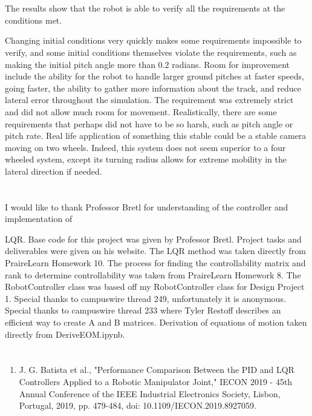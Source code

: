 \documentclass[10pt, letterbox]{article}
\begin{document}
\section{}
\begin{addmargin}[5em]{0em}
The results show that the robot is able to verify all the requirements at the conditions met. \end{addmargin}Changing initial conditions very quickly makes some requirements impossible to verify, and some initial conditions themselves violate the requirements, such as making the initial pitch angle more than 0.2 radians. Room for improvement include the ability for the robot to handle larger ground pitches at faster speeds, going faster, the ability to gather more information about the track, and reduce lateral error throughout the simulation. The requirement was extremely strict and did not allow much room for movement. Realistically, there are some requirements that perhaps did not have to be so harsh, such as pitch angle or pitch rate. Real life application of something this stable could be a stable camera moving on two wheels. Indeed, this system does not seem superior to a four wheeled system, except its turning radius allows for extreme mobility in the lateral direction if needed. 
\section*{}
\begin{addmargin}[5em]{0em}
I would like to thank Professor Bretl for understanding of the controller and implementation of \end{addmargin} LQR. Base code for this project was given by Professor Bretl. Project tasks and deliverables were given on his website. The LQR method was taken directly from PraireLearn Homework 10. The process for finding the controllability matrix and rank to determine controllability was taken from PraireLearn Homework 8. The RobotController class was based off my RobotController class for Design Project 1. Special thanks to campuswire thread 249, unfortunately it is anonymous. Special thanks to campuswire thread 233 where Tyler Restoff describes an efficient way to create A and B matrices. Derivation of equations of motion taken directly from DeriveEOM.ipynb. 
\section*{}
\begin{enumerate}
  \item J. G. Batista et al., "Performance Comparison Between the PID and LQR Controllers Applied to a Robotic Manipulator Joint," IECON 2019 - 45th Annual Conference of the IEEE Industrial Electronics Society, Lisbon, Portugal, 2019, pp. 479-484, doi: 10.1109/IECON.2019.8927059.
\end{enumerate}
\end{document}
